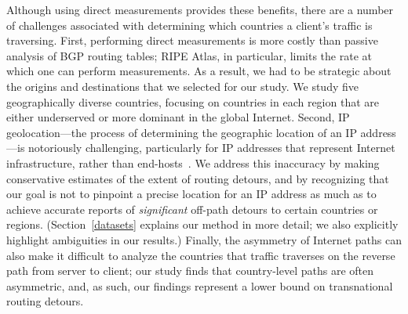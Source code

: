 Although using direct measurements provides these benefits, there are a number of 
challenges associated with determining which countries a
client's traffic is traversing.  First,
performing direct measurements is more costly than passive analysis of BGP
routing tables; RIPE Atlas, in particular, limits the rate at which one can
perform measurements.  As a result, we had to be strategic about the origins
and destinations that we selected for our study. We study five
geographically diverse countries,  focusing on countries in each region that
are either underserved or more dominant in the global Internet.  Second, IP
geolocation---the process of determining the geographic location of an IP
address---is notoriously challenging, particularly for IP addresses that
represent Internet infrastructure, rather than end-hosts~\cite{gharaibeh2017look}. We address this
inaccuracy by making conservative estimates of the extent of routing detours,
and by recognizing that our goal is not to pinpoint a precise location for an
IP address as much as to achieve accurate reports of {\em significant} off-path 
detours to certain countries or regions. (Section~\ref{datasets} explains
our method in more detail; we also explicitly highlight ambiguities in our
results.) Finally, the asymmetry of Internet paths can also make it difficult
to analyze the countries that traffic traverses on the reverse path from
server to client; our study finds that country-level paths are often
asymmetric, and, as such, our findings represent a lower bound on
transnational routing detours.

